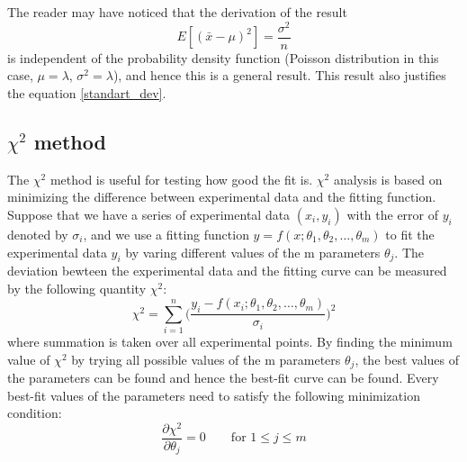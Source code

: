 \documentclass[12pt,a4paper]{report}
\begin{document}
The reader may have noticed that the derivation of the result
\begin{equation} \label{error_of_sample_mean}
E[(\bar{x} - \mu )^2] = \frac{\sigma^2}{n}
\end{equation}
is independent of the probability density function (Poisson distribution in this case, $\mu=\lambda$, $\sigma^2=\lambda$), and hence this is a general result. This result also justifies the equation \ref{standart_dev}.

\subsection{$\chi^2$ method}
The $\chi^2$ method is useful for testing how good the fit is.
$\chi^2$ analysis \cite{stat_2, BAKER1984437, reduced_chi_squared} is based on minimizing the difference between experimental data and the fitting function. Suppose that we have a series of experimental data $(x_i,y_i)$ with the error of $y_i$ denoted by $\sigma_i$, and we use a fitting function $y = f(x;\theta_1,\theta_2,\dots,\theta_m)$ to fit the experimental data $y_i$ by varing different values of the m parameters $\theta_j$. The deviation bewteen the experimental data and the fitting curve can be measured by the following quantity $\chi^2$:
\begin{equation} \label{chi_square_formula}
\chi^2 = \sum_{i = 1}^{n} \Big ( \frac{y_i - f(x_i;\theta_1,\theta_2,\dots,\theta_m)}{\sigma_i} \Big )^2
\end{equation}
where summation is taken over all experimental points.
By finding the minimum value of $\chi^2$ by trying all possible values of the m parameters $\theta_j$, the best values of the parameters can be found and hence the best-fit curve can be found.
Every best-fit values of the parameters need to satisfy the following minimization condition:
\begin{equation} \label{chi_minimisation_condition}
\frac{\partial \chi^2}{\partial \theta_j} = 0 \qquad \text{for } 1 \leq  j \leq m
\end{equation}
\end{document}

